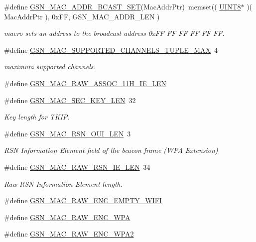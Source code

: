 \begin{DoxyCompactItemize}
\#define \hyperlink{a00642_ga3b8dd261cd46e061d18d2630039df685}{GSN\_\-MAC\_\-ADDR\_\-BCAST\_\-SET}(MacAddrPtr)~memset(( \hyperlink{a00660_gab27e9918b538ce9d8ca692479b375b6a}{UINT8}$\ast$ )( MacAddrPtr ), 0xFF, GSN\_\-MAC\_\-ADDR\_\-LEN )
\begin{DoxyCompactList}\small\item\em macro sets an address to the broadcast address 0xFF FF FF FF FF FF. \end{DoxyCompactList}\item 
\#define \hyperlink{a00642_gac3c796c333ec1130603aadab0258164a}{GSN\_\-MAC\_\-SUPPORTED\_\-CHANNELS\_\-TUPLE\_\-MAX}~4
\begin{DoxyCompactList}\small\item\em maximum supported channels. \end{DoxyCompactList}\item 
\#define \hyperlink{a00522_ad25b30f0499b7361d323e93f0393edd5}{GSN\_\-MAC\_\-RAW\_\-ASSOC\_\-11H\_\-IE\_\-LEN}
\item 
\#define \hyperlink{a00642_gabedb9ac65e149bcb1082d6926937508f}{GSN\_\-MAC\_\-SEC\_\-KEY\_\-LEN}~32
\begin{DoxyCompactList}\small\item\em Key length for TKIP. \end{DoxyCompactList}\item 
\#define \hyperlink{a00522_a8b43b8bccd505160fcc2ce3404b04c57}{GSN\_\-MAC\_\-RSN\_\-OUI\_\-LEN}~3
\begin{DoxyCompactList}\small\item\em RSN Information Element field of the beacon frame (WPA Extension) \end{DoxyCompactList}\item 
\#define \hyperlink{a00642_gade0df88c41a2fec188655329c10a73ed}{GSN\_\-MAC\_\-RAW\_\-RSN\_\-IE\_\-LEN}~34
\begin{DoxyCompactList}\small\item\em Raw RSN Information Element length. \end{DoxyCompactList}\item 
\#define \hyperlink{a00522_a45e2557a2f758ea4326592b4ffdb12d5}{GSN\_\-MAC\_\-RAW\_\-ENC\_\-EMPTY\_\-WIFI}
\item 
\#define \hyperlink{a00522_aca1b7df73d2928f30231c28bf61b0d35}{GSN\_\-MAC\_\-RAW\_\-ENC\_\-WPA}
\item 
\#define \hyperlink{a00522_a83bb49946fc9d9f022e614c8880f2527}{GSN\_\-MAC\_\-RAW\_\-ENC\_\-WPA2}
\item 

\end{DoxyCompactItemize}
